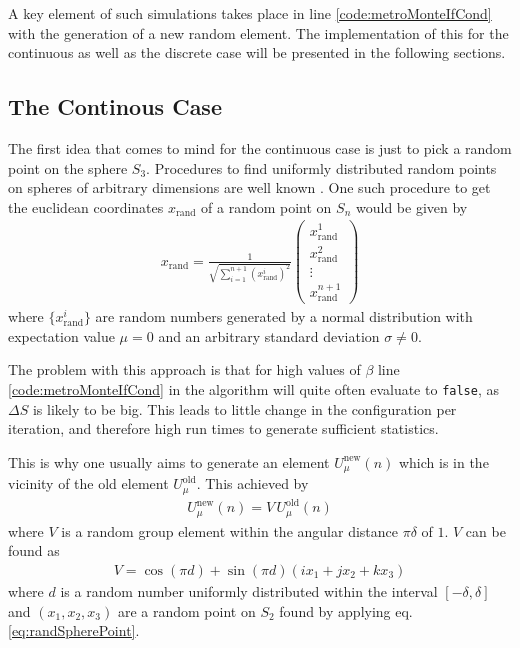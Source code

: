 A key element of such simulations takes place in line \ref{code:metroMonteIfCond} with the generation of a new random element. The implementation of this for the continuous as well as the discrete case will be presented in the following sections.

\subsection{The Continous Case}
The first idea that comes to mind for the continuous case is just to pick a random point on the sphere $S_3$. Procedures to find uniformly distributed random points on spheres of arbitrary dimensions are well known \cite{Tashiro:1977}. One such procedure to get the euclidean coordinates $x_{\textrm{rand}}$ of a random point on $S_n$ would be given by
\begin{align}
 x_{\textrm{rand}} = \frac{1}{\sqrt{\sum_{i=1}^{n+1}(x^i_{\textrm{rand}})^2}} \begin{pmatrix}
  x^1_{\textrm{rand}} \\
  x^2_{\textrm{rand}} \\
  \vdots              \\
  x^{n+1}_{\textrm{rand}}
 \end{pmatrix}
 \label{eq:randSpherePoint}
\end{align}
where $\{x^i_{\textrm{rand}}\}$ are random numbers generated by a normal distribution with expectation value $\mu = 0$ and an arbitrary standard deviation $\sigma \neq 0$.

The problem with this approach is that for high values of $\beta$ line \ref{code:metroMonteIfCond} in the algorithm will quite often evaluate to \texttt{false}, as $\Delta S$ is likely to be big. This leads to little change in the configuration per iteration, and therefore high run times to generate sufficient statistics.

This is why one usually aims to generate an element $U_\mu^{\textrm{new}}(n)$ which is in the vicinity of the old element $U_\mu^{\textrm{old}}$. This achieved by
\begin{align*}
 U_\mu^{\textrm{new}}(n) = V \, U_\mu^{\textrm{old}} (n)
\end{align*}
where $V$ is a random group element within the angular distance $\pi \delta$ of $1$. $V$ can be found as
\begin{align}
 V = \cos (\pi d ) + \sin (\pi d) \left(i x_1  + j x_2  + k x_3\right)
 \label{eq:transitionV}
\end{align}
where $d$ is a random number uniformly distributed within the interval $[-\delta,\delta]$ and $(x_1,x_2,x_3)$ are a random point on $S_2$ found by applying eq. \ref{eq:randSpherePoint}.

